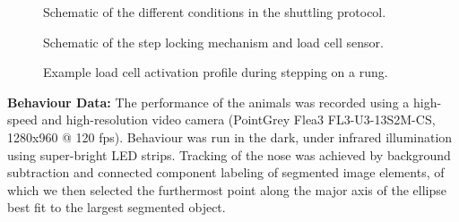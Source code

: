 \begin{figure}
\begin{center}

\end{center}
\vspace{-5mm}
\caption{Schematic of the different conditions in the shuttling protocol.}
\label{fig:shuttlingProtocol}
\end{figure}

\begin{figure}
\begin{center}

\end{center}
\vspace{-5mm}
\caption{Schematic of the step locking mechanism and load cell sensor.}
\label{fig:shuttlingSteps}
\end{figure}

\begin{figure}
\begin{center}

\end{center}
\vspace{-5mm}
\caption{Example load cell activation profile during stepping on a rung.}
\label{fig:loadCellProfile}
\end{figure}

\textbf{Behaviour Data:} The performance of the animals was recorded using a high-speed and high-resolution video camera (PointGrey Flea3 FL3-U3-13S2M-CS, 1280x960 @ 120 fps). Behaviour was run in the dark, under infrared illumination using super-bright LED strips. Tracking of the nose was achieved by background subtraction and connected component labeling of segmented image elements, of which we then selected the furthermost point along the major axis of the ellipse best fit to the largest segmented object.


